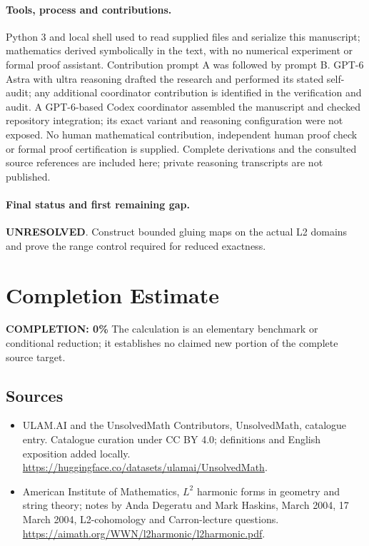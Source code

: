 \documentclass[11pt]{article}
\begin{document}
\paragraph{Tools, process and contributions.}
Python 3 and local shell used to read supplied files and serialize this manuscript; mathematics derived symbolically in the text, with no numerical experiment or formal proof assistant. Contribution prompt A was followed by prompt B. GPT-6 Astra with ultra reasoning drafted the research and performed its stated self-audit; any additional coordinator contribution is identified in the verification and audit. A GPT-6-based Codex coordinator assembled the manuscript and checked repository integration; its exact variant and reasoning configuration were not exposed. No human mathematical contribution, independent human proof check or formal proof certification is supplied. Complete derivations and the consulted source references are included here; private reasoning transcripts are not published.

\paragraph{Final status and first remaining gap.}
\textbf{UNRESOLVED}. Construct bounded gluing maps on the actual L2 domains and prove the range control required for reduced exactness.

\section{Completion Estimate}
\noindent\textbf{COMPLETION: 0\%}
The calculation is an elementary benchmark or conditional reduction; it establishes no claimed new portion of the complete source target.

\subsection{Sources}
\begin{itemize}
\item[\hypertarget{source:statement:1}{S1}] ULAM.AI and the UnsolvedMath Contributors, UnsolvedMath, catalogue entry. Catalogue curation under CC BY 4.0; definitions and English exposition added locally.
\url{https://huggingface.co/datasets/ulamai/UnsolvedMath}.
\item[\hypertarget{source:statement:2}{S2}] American Institute of Mathematics, $L^2$ harmonic forms in geometry and string theory; notes by Anda Degeratu and Mark Haskins, March 2004, 17 March 2004, L2-cohomology and Carron-lecture questions.
\url{https://aimath.org/WWN/l2harmonic/l2harmonic.pdf}.
\end{itemize}
\label{end:statement}
\end{document}
